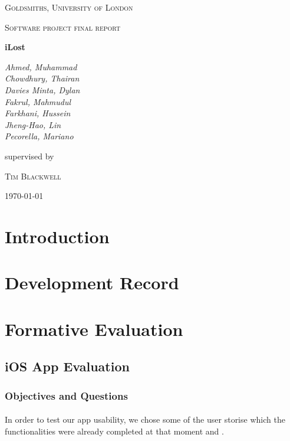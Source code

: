 \documentclass[12pt,a4paper]{article}
\begin{document}
    \begin{titlepage}
      \centering
      {\scshape\LARGE Goldsmiths, University of London \par}
      \vspace{1cm}
      {\scshape\Large Software project final report\par}
      \vspace{1.5cm}
      {\huge\bfseries iLost\par}
      \vspace{2cm}
      {\Large\itshape 
        Ahmed, Muhammad\\
        Chowdhury, Thairan\\
        Davies Minta, Dylan\\     
        Fakrul, Mahmudul\\    
        Farkhani, Hussein\\ 
        Jheng-Hao, Lin\\
        Pecorella, Mariano\\ \par}
      \vfill
      supervised by\par
      \textsc{Tim Blackwell} 
      \vfill
      {\large \today \par}
    \end{titlepage}

    \tableofcontents
    \newpage

    \section{Introduction}
    \section{Development Record}
    \newpage
    \section{Formative Evaluation}
      \subsection{iOS App Evaluation} 
        \subsubsection{Objectives and Questions}
          \paragraph{}
            In order to test our app usability, we chose some of the user storise which the functionalities were already completed at that moment and .
\end{document}
